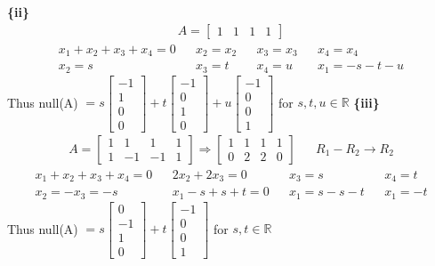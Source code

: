 \documentclass{article}
\begin{document}
\textbf{\{ii\}}
\begin{align*} A = 
    \begin{bmatrix}
        1 & 1 & 1 & 1
    \end{bmatrix}
\end{align*}
\begin{align*}
    x_1 + x_2 + x_3 + x_4 = 0 &&
    x_2 = x_2 && x_3 = x_3 && x_4 = x_4 \\
    x_2 = s && x_3 = t && x_4 = u && x_1 = -s -t - u
\end{align*}
Thus null(A) $ = s\begin{bmatrix} -1 \\ 1 \\ 0 \\ 0\end{bmatrix} + t\begin{bmatrix} -1 \\ 0 \\ 1 \\ 0\end{bmatrix} +u\begin{bmatrix} -1 \\ 0 \\ 0 \\ 1\end{bmatrix} $   for $s,t,u \in \mathbb{R}$ \newline
\textbf{\{iii\}}
\begin{align*} A = 
    \begin{bmatrix}
        1 & 1 & 1 & 1 \\
        1 & -1 & -1 & 1
    \end{bmatrix} \Rightarrow
    \begin{bmatrix}
        1 & 1 & 1 & 1 \\
        0 & 2 & 2 & 0
    \end{bmatrix} && R_1 - R_2 \xrightarrow{} R_2
\end{align*}
\begin{align*}
    x_1+x_2+x_3+x_4 = 0 && 2x_2 + 2x_3 = 0 && x_3 = s && x_4 = t \\
    x_2 = -x_3 = -s && x_1 - s + s + t = 0 && x_1 = s - s - t && x_1 = -t
\end{align*}
Thus null(A) $ = s\begin{bmatrix} 0 \\ -1 \\ 1 \\ 0\end{bmatrix} + t\begin{bmatrix} -1 \\ 0 \\ 0 \\ 1\end{bmatrix} $   for $s,t \in \mathbb{R}$ \newline
\end{document}
